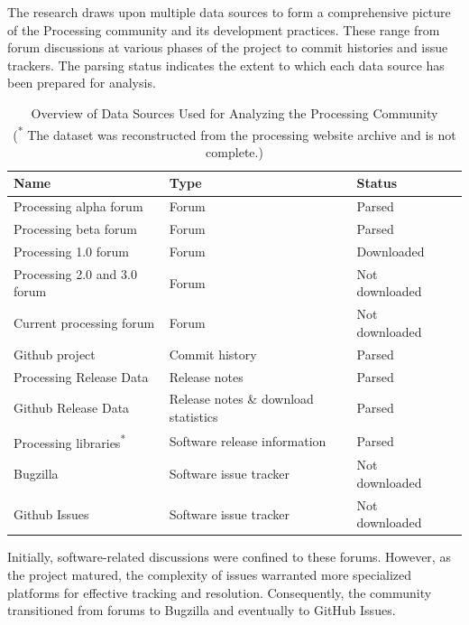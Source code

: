 The research draws upon multiple data sources to form a comprehensive picture of the Processing community and its development practices. These range from forum discussions at various phases of the project to commit histories and issue trackers. The parsing status indicates the extent to which each data source has been prepared for analysis. 
%      
\begin{table}
    \begin{adjustbox}{center}
    \begin{tabular}{l l l c}
        \toprule
        Name & Type & Status \\
        \midrule
        Processing alpha forum & Forum & Parsed \\
        Processing beta forum & Forum & Parsed  \\
        Processing 1.0 forum & Forum & Downloaded \\
        Processing 2.0 and 3.0 forum & Forum  & Not downloaded \\
        Current processing forum & Forum & Not downloaded\\
        Github project & Commit history & Parsed \\
        Processing Release Data & Release notes & Parsed \\
        Github Release Data & Release notes \& download statistics & Parsed \\
        Processing libraries\textsuperscript{*} & Software release information & Parsed \\
        Bugzilla & Software issue tracker & Not downloaded \\
        Github Issues & Software issue tracker & Not downloaded \\
        \bottomrule
    \end{tabular}
    \end{adjustbox}
    \caption{Overview of Data Sources Used for Analyzing the Processing Community\\(\textsuperscript{*} The dataset was reconstructed from the processing website archive and is not complete.)}
  \end{table}

Initially, software-related discussions were confined to these forums. However, as the project matured, the complexity of issues warranted more specialized platforms for effective tracking and resolution. Consequently, the community transitioned from forums to Bugzilla \parencite{BugzillaArchiveProcessing} and eventually to GitHub Issues\parencite{ProcessingProcessingSource}\parencite{ProcessingProcessing4Processing}. 

